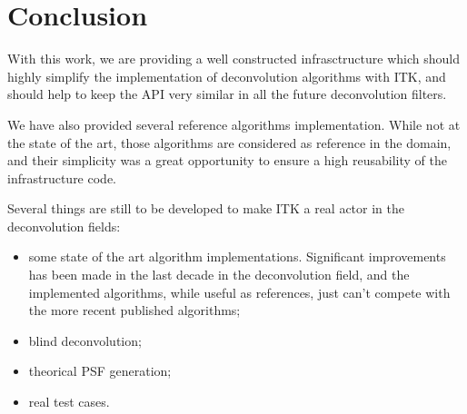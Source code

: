 \documentclass{InsightArticle}
\begin{document}
\section{Conclusion}

With this work, we are providing a well constructed infrasctructure which should highly simplify the implementation
of deconvolution algorithms with ITK, and should help to keep the API very similar in all the future deconvolution filters.

We have also provided several reference algorithms implementation. While not at the state of the art, those algorithms are
considered as reference in the domain, and their simplicity was a great opportunity to ensure a high reusability of the
infrastructure code.

Several things are still to be developed to make ITK a real actor in the deconvolution fields:

\begin{itemize}
 \item some state of the art algorithm implementations. Significant improvements has been made in the last decade
in the deconvolution field, and the implemented algorithms, while useful as references, just can't compete with the
more recent published algorithms;
 \item blind deconvolution;
 \item theorical PSF generation;
 \item real test cases.
\end{itemize}










\appendix





\nocite{ITKSoftwareGuide}
\end{document}

